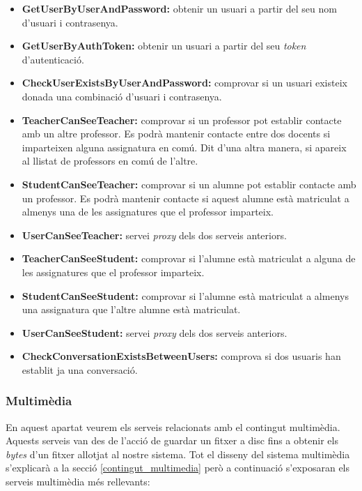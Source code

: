 		\begin{itemize}
			\item \textbf{GetUserByUserAndPassword:} obtenir un usuari a partir del seu nom d'usuari i contrasenya.
			\item \textbf{GetUserByAuthToken:} obtenir un usuari a partir del seu \emph{token} d'autenticació.
			\item \textbf{CheckUserExistsByUserAndPassword:} comprovar si un usuari existeix donada una combinació d'usuari i contrasenya.
			\item \textbf{TeacherCanSeeTeacher:} comprovar si un professor pot establir contacte amb un altre professor. Es podrà mantenir contacte entre dos docents si imparteixen alguna assignatura en comú. Dit d'una altra manera, si apareix al llistat de professors en comú de l'altre.
			\item \textbf{StudentCanSeeTeacher:} comprovar si un alumne pot establir contacte amb un professor. Es podrà mantenir contacte si aquest alumne està matriculat a almenys una de les assignatures que el professor imparteix.
			\item \textbf{UserCanSeeTeacher:} servei \emph{proxy} dels dos serveis anteriors.
			\item \textbf{TeacherCanSeeStudent:} comprovar si l'alumne està matriculat a alguna de les assignatures que el professor imparteix.
			\item \textbf{StudentCanSeeStudent:} comprovar si l'alumne està matriculat a almenys una assignatura que l'altre alumne està matriculat.
			\item \textbf{UserCanSeeStudent:} servei \emph{proxy} dels dos serveis anteriors.
			\item \textbf{CheckConversationExistsBetweenUsers:} comprova si dos usuaris han establit ja una conversació.
			
		\end{itemize}
			
		\subsubsection{Multimèdia}
		
		En aquest apartat veurem els serveis relacionats amb el contingut multimèdia. Aquests serveis van des de l'acció de guardar un fitxer a disc fins a obtenir els \emph{bytes} d'un fitxer allotjat al nostre sistema. Tot el disseny del sistema multimèdia s'explicarà a la secció \ref{contingut_multimedia} però a continuació s'exposaran els serveis multimèdia més rellevants:
		
